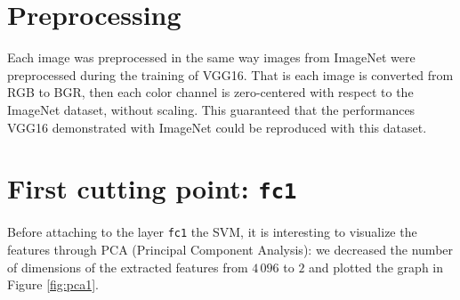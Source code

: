 \documentclass[compsoc]{IEEEtran}
\begin{document}
\begin{table}[ht!]
\centering
{}
\caption{Number of VGG16's trainable parameters and dimensions of the extracted features at each cutting point}
\label{tab:dims}
\end{table}

\section{Preprocessing}
Each image was preprocessed in the same way images from ImageNet were preprocessed during the training of VGG16. That is each image is converted from RGB to BGR, then each color channel is zero-centered with respect to the ImageNet dataset, without scaling. This guaranteed that the performances VGG16 demonstrated with ImageNet could be reproduced with this dataset.

\section{First cutting point: \texttt{fc1}}\label{sec:fc1}

Before attaching to the layer \texttt{fc1} the SVM, it is interesting to visualize the features through PCA (Principal Component Analysis): we decreased the number of dimensions of the extracted features from $4\,096$ to $2$ and plotted the graph in Figure \ref{fig:pca1}.
\end{document}

